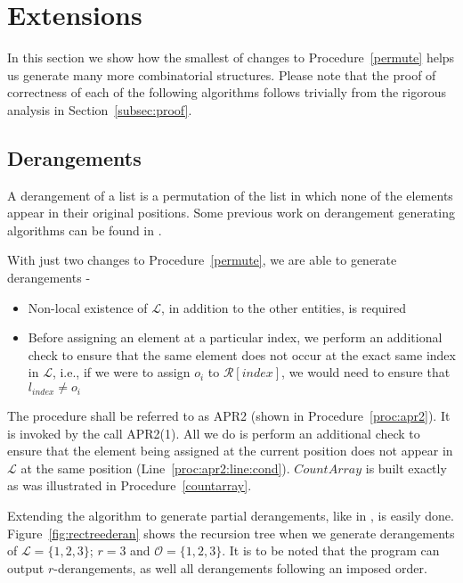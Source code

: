 \documentclass{article}
\begin{document}
\section{Extensions}
\label{sec:exten}

In this section we show how the smallest of changes to Procedure~\ref{permute} helps us generate many more combinatorial structures. Please note that the proof of correctness of each of the following algorithms follows trivially from the rigorous analysis in Section~\ref{subsec:proof}.

\subsection{Derangements}

A derangement of a list is a permutation of the list in which none of the elements appear in their original positions. Some previous work on derangement generating algorithms can be found in \cite{deran2, deran1}.

With just two changes to Procedure~\ref{permute}, we are able to generate derangements - 
\begin{itemize}
 \item Non-local existence of $\mathcal{L}$, in addition to the other entities, is required
 \item Before assigning an element at a particular index, we perform an additional check to ensure that the same element does not occur at the exact same index in $\mathcal{L}$, i.e., if we were to assign $o_i$ to $\mathcal{R}[index]$, we would need to ensure that $l_{index} \neq o_i$
\end{itemize}

The procedure shall be referred to as APR2 (shown in Procedure~\ref{proc:apr2}). It is invoked by the call APR2(1). All we do is perform an additional check to ensure that the element being assigned at the current position does not appear in $\mathcal{L}$ at the same position (Line~\ref{proc:apr2:line:cond}). $CountArray$ is built exactly as was illustrated in Procedure~\ref{countarray}.

Extending the algorithm to generate partial derangements, like in \cite{partialderan}, is easily done. Figure~\ref{fig:rectreederan} shows the recursion tree when we generate derangements of $\mathcal{L} = \{1,2,3\}$; $r=3$ and $\mathcal{O}=\{1,2,3\}$. It is to be noted that the program can output $r$-derangements, as well all derangements following an imposed order.
\end{document}
